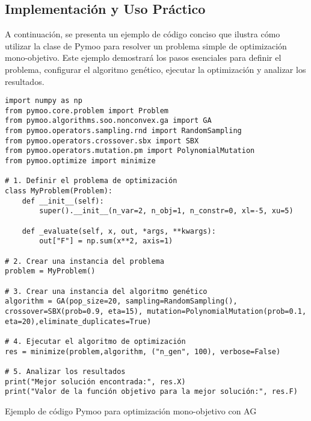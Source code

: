 \subsection{Implementación y Uso Práctico}
\vspace{0.2cm}
A continuación, se presenta un ejemplo de código conciso que ilustra cómo utilizar la clase \texttt{} de Pymoo para resolver un problema simple de optimización mono-objetivo. Este ejemplo demostrará los pasos esenciales para definir el problema, configurar el algoritmo genético, ejecutar la optimización y analizar los resultados.
\vspace{0.2cm}
\begin{listing}[H]
\begin{verbatim}
import numpy as np
from pymoo.core.problem import Problem
from pymoo.algorithms.soo.nonconvex.ga import GA
from pymoo.operators.sampling.rnd import RandomSampling
from pymoo.operators.crossover.sbx import SBX
from pymoo.operators.mutation.pm import PolynomialMutation
from pymoo.optimize import minimize

# 1. Definir el problema de optimización
class MyProblem(Problem):
    def __init__(self):
        super().__init__(n_var=2, n_obj=1, n_constr=0, xl=-5, xu=5)

    def _evaluate(self, x, out, *args, **kwargs):
        out["F"] = np.sum(x**2, axis=1)

# 2. Crear una instancia del problema
problem = MyProblem()

# 3. Crear una instancia del algoritmo genético
algorithm = GA(pop_size=20, sampling=RandomSampling(), crossover=SBX(prob=0.9, eta=15), mutation=PolynomialMutation(prob=0.1, eta=20),eliminate_duplicates=True)

# 4. Ejecutar el algoritmo de optimización
res = minimize(problem,algorithm, ("n_gen", 100), verbose=False)

# 5. Analizar los resultados
print("Mejor solución encontrada:", res.X)
print("Valor de la función objetivo para la mejor solución:", res.F)
\end{verbatim}
\caption{Ejemplo de código Pymoo para optimización mono-objetivo con AG}
\label{lst:pymoo_example}
\end{listing}



